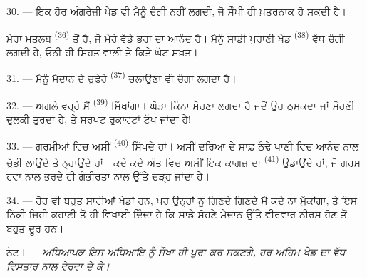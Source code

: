 30. --- ਇਕ ਹੋਰ ਅੰਗਰੇਜ਼ੀ ਖੇਡ ਵੀ ਮੈਨੂੰ ਚੰਗੀ ਨਹੀਂ ਲਗਦੀ, ਜੋ ਸੌਖੀ ਹੀ ਖ਼ਤਰਨਾਕ ਹੋ
ਸਕਦੀ ਹੈ।

ਮੇਰਾ ਮਤਲਬ  \textsuperscript{(36)} ਤੋਂ ਹੈ, ਜੋ ਮੇਰੇ ਵੱਡੇ ਭਰਾ ਦਾ
ਆਨੰਦ ਹੈ। ਮੈਨੂੰ ਸਾਡੀ ਪੁਰਾਣੀ ਖੇਡ  \textsuperscript{(38)} ਵੱਧ
ਚੰਗੀ ਲਗਦੀ ਹੈ, ਓਨੀ ਹੀ ਸਿਹਤ ਵਾਲੀ ਤੇ ਕਿਤੇ ਘੱਟ ਸਖ਼ਤ।

\VUsaut{4.6mm}
\VUsaut{3.0mm}

31. --- ਮੈਨੂੰ ਮੈਦਾਨ ਦੇ ਚੁਫੇਰੇ  \textsuperscript{(37)} ਚਲਾਉਣਾ ਵੀ
ਚੰਗਾ ਲਗਦਾ ਹੈ।

32. --- ਅਗਲੇ ਵਰ੍ਹੇ ਮੈਂ  \textsuperscript{(39)} ਸਿੱਖਾਂਗਾ। ਘੋੜਾ
ਕਿੰਨਾ ਸੋਹਣਾ ਲਗਦਾ ਹੈ ਜਦੋਂ ਉਹ ਠੁਮਕਦਾ ਜਾਂ ਸੋਹਣੀ ਦੁਲਕੀ ਤੁਰਦਾ ਹੈ, ਤੇ ਸਰਪਟ ਰੁਕਾਵਟਾਂ
ਟੱਪ ਜਾਂਦਾ ਹੈ!

33. --- ਗਰਮੀਆਂ ਵਿਚ ਅਸੀਂ  \textsuperscript{(40)} ਸਿੱਖਦੇ ਹਾਂ। ਅਸੀਂ
ਦਰਿਆ ਦੇ ਸਾਫ਼ ਠੰਢੇ ਪਾਣੀ ਵਿਚ ਆਨੰਦ ਨਾਲ ਚੁੱਭੀ ਲਾਉਂਦੇ ਤੇ ਨ੍ਹਾਉਂਦੇ ਹਾਂ। ਕਦੇ ਕਦੇ ਅੰਤ
ਵਿਚ ਅਸੀਂ ਇਕ ਕਾਗਜ਼ ਦਾ  \textsuperscript{(41)} ਉਡਾਉਂਦੇ ਹਾਂ, ਜੋ ਗਰਮ
ਹਵਾ ਨਾਲ ਭਰਦੇ ਹੀ ਗੰਭੀਰਤਾ ਨਾਲ ਉੱਤੇ ਚੜ੍ਹ ਜਾਂਦਾ ਹੈ।

34. --- ਹੋਰ ਵੀ ਬਹੁਤ ਸਾਰੀਆਂ ਖੇਡਾਂ ਹਨ, ਪਰ ਉਨ੍ਹਾਂ ਨੂੰ ਗਿਣਦੇ ਗਿਣਦੇ ਮੈਂ ਕਦੇ ਨਾ
ਮੁੱਕਾਂਗਾ, ਤੇ ਇਸ ਨਿੱਕੀ ਜਿਹੀ ਕਹਾਣੀ ਤੋਂ ਹੀ ਵਿਖਾਈ ਦਿੰਦਾ ਹੈ ਕਿ ਸਾਡੇ ਸੋਹਣੇ ਮੈਦਾਨ
ਉੱਤੇ ਵੀਰਵਾਰ ਨੀਰਸ ਹੋਣ ਤੋਂ ਬਹੁਤ ਦੂਰ ਹਨ।

ਨੋਟ। --- \textit{ਅਧਿਆਪਕ ਇਸ ਅਧਿਆਇ ਨੂੰ ਸੌਖਾ ਹੀ ਪੂਰਾ ਕਰ ਸਕਣਗੇ, ਹਰ ਅਹਿਮ ਖੇਡ ਦਾ
ਵੱਧ ਵਿਸਤਾਰ ਨਾਲ ਵੇਰਵਾ ਦੇ ਕੇ।}
\VUsaut{6.0mm}
\VUfilet{22mm}
